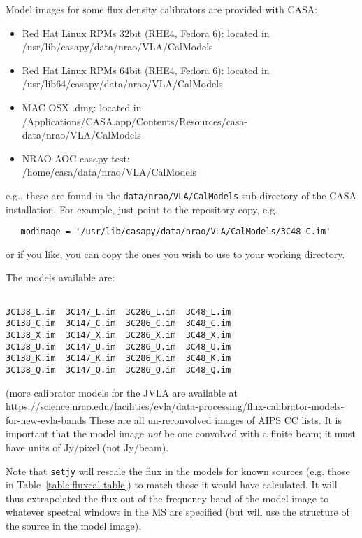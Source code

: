 {Model images for some flux density calibrators are provided with CASA:
\begin{itemize}
   \item Red Hat Linux RPMs 32bit (RHE4, Fedora 6): 
         located in\\ /usr/lib/casapy/data/nrao/VLA/CalModels
   \item Red Hat Linux RPMs 64bit (RHE4, Fedora 6): 
         located in\\ /usr/lib64/casapy/data/nrao/VLA/CalModels
   \item MAC OSX .dmg: located in\\ /Applications/CASA.app/Contents/Resources/casa-data/nrao/VLA/CalModels
   \item NRAO-AOC casapy-test:\\ /home/casa/data/nrao/VLA/CalModels
\end{itemize}
e.g., these are found in the {\tt data/nrao/VLA/CalModels}
sub-directory of the CASA installation.  For example, just point to the
repository copy, e.g.
\small
\begin{verbatim}
   modimage = '/usr/lib/casapy/data/nrao/VLA/CalModels/3C48_C.im'
\end{verbatim}
\normalsize
or if you like, you can copy the ones you wish to use to your working
directory.

The models available are:
\small
\begin{verbatim}

3C138_L.im  3C147_L.im  3C286_L.im  3C48_L.im
3C138_C.im  3C147_C.im  3C286_C.im  3C48_C.im
3C138_X.im  3C147_X.im  3C286_X.im  3C48_X.im
3C138_U.im  3C147_U.im  3C286_U.im  3C48_U.im
3C138_K.im  3C147_K.im  3C286_K.im  3C48_K.im
3C138_Q.im  3C147_Q.im  3C286_Q.im  3C48_Q.im
\end{verbatim}

(more calibrator models for the JVLA are available at\\
\url{https://science.nrao.edu/facilities/evla/data-processing/flux-calibrator-models-for-new-evla-bands}
\normalsize
These are all un-reconvolved images of AIPS CC lists.  
It is important that the model image {\em not} be one
convolved with a finite beam; it must have units of Jy/pixel (not
Jy/beam).  

Note that {\tt setjy} will rescale the flux in the models for known
sources (e.g. those in Table~\ref{table:fluxcal-table}) to match those
it would have calculated.  It will thus extrapolated the flux out of
the frequency band of the model image to whatever spectral windows
in the MS are specified (but will use the structure of the source
in the model image).

}
